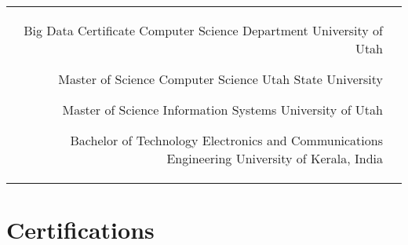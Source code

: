 \documentclass[10pt]{article} %
\begin{document}
\begin{paracol}{2}


\begin{supertabular}{rl} %
	
	{Big Data Certificate} %
	{} %
	{Computer Science Department} %
	{University of Utah} %
	
	{Master of Science} %
	{} %
	{Computer Science} %
	{Utah State University} %
	
	{Master of Science} %
	{} %
	{Information Systems} %
	{University of Utah} %

	
	{Bachelor of Technology} %
	{} %
	{Electronics and Communications Engineering} %
	{University of Kerala, India} %
	

	

	

\end{supertabular}


\section{Certifications}




\end{paracol}
\end{document}
